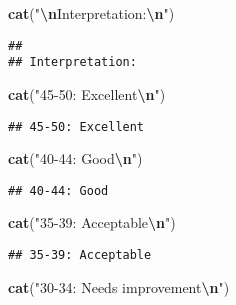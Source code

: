 \documentclass[
]{article}
\newenvironment{Shaded}{\begin{snugshade}}{\end{snugshade}}
\newcommand{\FunctionTok}[1]{\textcolor[rgb]{0.13,0.29,0.53}{\textbf{#1}}}
\newcommand{\NormalTok}[1]{#1}
\newcommand{\SpecialCharTok}[1]{\textcolor[rgb]{0.81,0.36,0.00}{\textbf{#1}}}
\newcommand{\StringTok}[1]{\textcolor[rgb]{0.31,0.60,0.02}{#1}}
\begin{document}
\begin{Shaded}
\begin{Highlighting}[]
\FunctionTok{cat}\NormalTok{(}\StringTok{"}\SpecialCharTok{\textbackslash{}n}\StringTok{Interpretation:}\SpecialCharTok{\textbackslash{}n}\StringTok{"}\NormalTok{)}
\end{Highlighting}
\end{Shaded}

\begin{verbatim}
## 
## Interpretation:
\end{verbatim}

\begin{Shaded}
\begin{Highlighting}[]
\FunctionTok{cat}\NormalTok{(}\StringTok{"45{-}50: Excellent}\SpecialCharTok{\textbackslash{}n}\StringTok{"}\NormalTok{)}
\end{Highlighting}
\end{Shaded}

\begin{verbatim}
## 45-50: Excellent
\end{verbatim}

\begin{Shaded}
\begin{Highlighting}[]
\FunctionTok{cat}\NormalTok{(}\StringTok{"40{-}44: Good}\SpecialCharTok{\textbackslash{}n}\StringTok{"}\NormalTok{) }
\end{Highlighting}
\end{Shaded}

\begin{verbatim}
## 40-44: Good
\end{verbatim}

\begin{Shaded}
\begin{Highlighting}[]
\FunctionTok{cat}\NormalTok{(}\StringTok{"35{-}39: Acceptable}\SpecialCharTok{\textbackslash{}n}\StringTok{"}\NormalTok{)}
\end{Highlighting}
\end{Shaded}

\begin{verbatim}
## 35-39: Acceptable
\end{verbatim}

\begin{Shaded}
\begin{Highlighting}[]
\FunctionTok{cat}\NormalTok{(}\StringTok{"30{-}34: Needs improvement}\SpecialCharTok{\textbackslash{}n}\StringTok{"}\NormalTok{)}
\end{Highlighting}
\end{Shaded}
\end{document}
